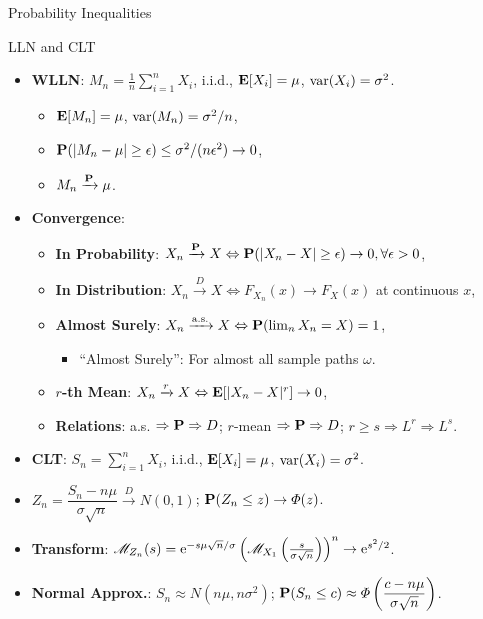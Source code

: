 \documentclass[landscape,a4paper]{article}
\begin{document}
\begin{cheatsheetcolumns}
\begin{card}{Probability Inequalities}
\begin{itemize}
\begin{itemize}
				\end{itemize}
			\end{itemize}
		\end{card}
		\begin{card}{LLN and CLT}
			\begin{itemize}
				\item \textbf{WLLN}: $M_n=\frac{1}{n}\sum_{i=1}^nX_i$, i.i.d., $\mathbf{E}[X_i]=\mu$, $\operatorname{var}(X_i)=\sigma^2$.
				\begin{itemize}
					\item $\mathbf{E}[M_n]=\mu$, $\operatorname{var}(M_n)=\sigma^2/n$,
					\item $\mathbf{P}(|M_n-\mu|\ge\epsilon)\le\sigma^2/(n\epsilon^2)\to0$,
					\item $M_n\xrightarrow{\mathbf{P}}\mu$.
				\end{itemize}
				\item \textbf{Convergence}:
				\begin{itemize}
					\item \textbf{In Probability}: $X_n\xrightarrow{\mathbf{P}}X\Leftrightarrow \mathbf{P}(|X_n-X|\ge\epsilon)\to0,\forall\epsilon>0$,
					\item \textbf{In Distribution}: $X_n\xrightarrow{D}X\Leftrightarrow F_{X_n}(x)\to F_X(x)$ at continuous $x$,
					\item \textbf{Almost Surely}: $X_n\xrightarrow{\mathrm{a.s.}}X\Leftrightarrow \mathbf{P}(\lim_nX_n=X)=1$,
					\begin{itemize}
						\item ``Almost Surely'': For almost all sample paths $\omega$.
					\end{itemize}
					\item \textbf{$r$-th Mean}: $X_n\xrightarrow{r}X\Leftrightarrow \mathbf{E}[|X_n-X|^r]\to0$,
					\item \textbf{Relations}: a.s. $\Rightarrow \mathbf{P}\Rightarrow D$; $r$-mean $\Rightarrow \mathbf{P}\Rightarrow D$; $r\ge s\Rightarrow L^r\Rightarrow L^s$.
				\end{itemize}
				\item \textbf{CLT}: $S_n=\sum_{i=1}^nX_i$, i.i.d., $\mathbf{E}[X_i]=\mu$, $\operatorname{var}(X_i)=\sigma^2$.
				\item $Z_n=\dfrac{S_n-n\mu}{\sigma\sqrt n}\xrightarrow{D}N(0,1)$; $\mathbf{P}(Z_n\le z)\to\varPhi(z)$.
				\item \textbf{Transform}: $\mathscr{M}_{Z_n}(s)=\mathrm{e}^{-s\mu\sqrt n/\sigma}\left(\mathscr{M}_{X_1}\left(\frac{s}{\sigma\sqrt n}\right)\right)^n\to \mathrm{e}^{s^2/2}$.
				\item \textbf{Normal Approx.}: $S_n\approx N(n\mu,n\sigma^2)$; $\mathbf{P}(S_n\le c)\approx\varPhi\left(\dfrac{c-n\mu}{\sigma\sqrt n}\right)$.

\end{itemize}
\end{card}
\end{cheatsheetcolumns}
\end{document}
